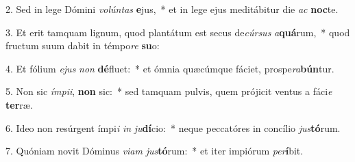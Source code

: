 2. Sed in lege Dómini \textit{vo}\textit{lún}\textit{tas} \textbf{e}jus,~*  et in lege ejus meditábitur die \textit{ac} \textbf{noc}te.\

3. Et erit tamquam lignum, quod plantátum est secus de\textit{cúr}\textit{sus} \textit{a}\textbf{quá}rum,~*  quod fructum suum dabit in témpo\textit{re} \textbf{su}o:\

4. Et fólium \textit{e}\textit{jus} \textit{non} \textbf{dé}fluet:~*  et ómnia quæcúmque fáciet, prospe\textit{ra}\textbf{bún}tur.\

5. Non sic \textit{ím}\textit{pi}\textit{i}, \textbf{non} sic:~*  sed tamquam pulvis, quem prójicit ventus a fáci\textit{e} \textbf{ter}ræ.\

6. Ideo non resúrgent ímpi\textit{i} \textit{in} \textit{ju}\textbf{dí}cio:~*  neque peccatóres in concílio \textit{jus}\textbf{tó}rum.\

7. Quóniam novit Dóminus \textit{vi}\textit{am} \textit{jus}\textbf{tó}rum:~*  et iter impiórum \textit{per}\textbf{í}bit.\

